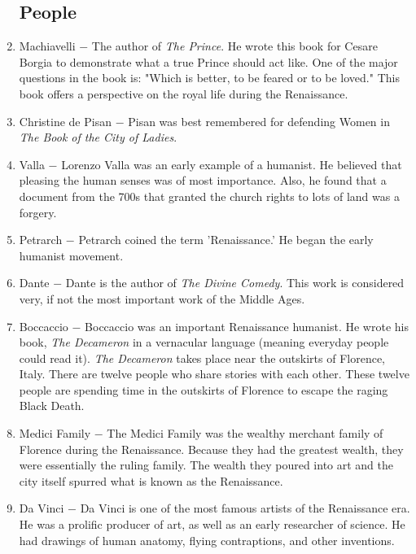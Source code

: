 \documentclass[12pt]{article}
\begin{document}
\begin{enumerate}
\subsection{People}

\item Machiavelli $-$ The author of \textit{The Prince}. He wrote this book for Cesare Borgia to demonstrate what a true Prince should act like. One of the major questions in the book is: "Which is better, to be feared or to be loved." This book offers a perspective on the royal life during the Renaissance.

\item Christine de Pisan $-$ Pisan was best remembered for defending Women in \textit{The Book of the City of Ladies}. 

\item Valla $-$ Lorenzo Valla was an early example of a humanist. He believed that pleasing the human senses was of most importance. Also, he found that a document from the 700s that granted the church rights to lots of land was a forgery.

\item Petrarch $-$ Petrarch coined the term 'Renaissance.' He began the early humanist movement. 

\item Dante $-$ Dante is the author of \textit{The Divine Comedy}. This work is considered very, if not the most important work of the Middle Ages. 

\item Boccaccio $-$ Boccaccio was an important Renaissance humanist. He wrote his book, \textit{The Decameron} in a vernacular language (meaning everyday people could read it). \textit{The Decameron} takes place near the outskirts of Florence, Italy. There are twelve people who share stories with each other. These twelve people are spending time in the outskirts of Florence to escape the raging Black Death.

\item Medici Family $-$ The Medici Family was the wealthy merchant family of Florence during the Renaissance. Because they had the greatest wealth, they were essentially the ruling family. The wealth they poured into art and the city itself spurred what is known as the Renaissance.

\item Da Vinci $-$ Da Vinci is one of the most famous artists of the Renaissance era. He was a prolific producer of art, as well as an early researcher of science. He had drawings of human anatomy, flying contraptions, and other inventions.


\end{enumerate}
\end{document}
